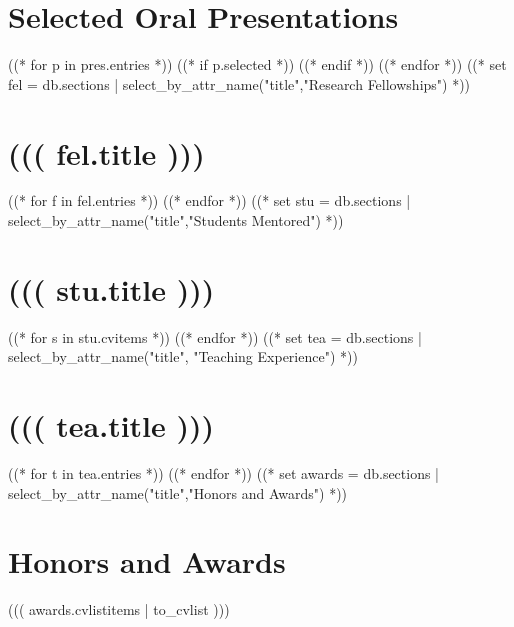\documentclass[10pt,a4paper,sans]{moderncv}
\begin{document}
  \section{Selected Oral Presentations}
  ((* for p in pres.entries *))
  ((* if p.selected *))
  ((* endif *))
  ((* endfor *))
  ((* set fel = db.sections | select_by_attr_name("title","Research Fellowships") *))
  \section{((( fel.title )))}
  ((* for f in fel.entries *))
  ((* endfor *))
  ((* set stu = db.sections | select_by_attr_name("title","Students Mentored") *))
  \section{((( stu.title )))}
  ((* for s in stu.cvitems *))
  ((* endfor *))
  ((* set tea = db.sections | select_by_attr_name("title", "Teaching Experience") *))
  \section{((( tea.title )))}
  ((* for t in tea.entries *))
  ((* endfor *))
  ((* set awards = db.sections | select_by_attr_name("title","Honors and Awards") *))
  \section{Honors and Awards}
  ((( awards.cvlistitems | to_cvlist )))
\end{document}
